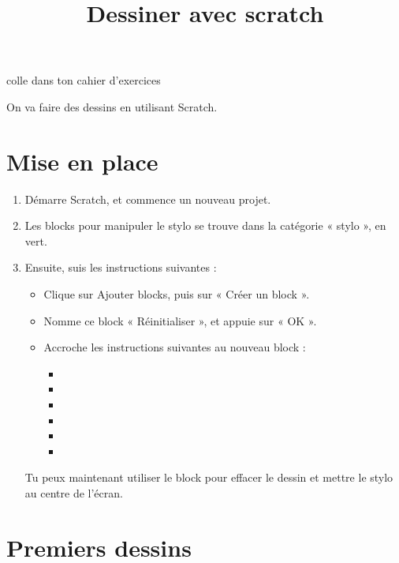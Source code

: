 \documentclass[a4paper,11pt]{article}
\title{Dessiner avec scratch}
\author{}
\date{}
\makeatletter
\renewcommand{\maketitle}{%
{\scriptsize colle dans ton cahier d'exercices}
	\begin{center}
		\LARGE
		\uline{\@title}
		\vspace{1em}
	\end{center}
}
\makeatother
\begin{document}
\maketitle

On va faire des dessins en utilisant Scratch.

\section{Mise en place}

\begin{enumerate}[1)]
	\item Démarre Scratch, et commence un nouveau projet.
	\item Les blocks pour manipuler le stylo se trouve dans la catégorie « stylo », en {\color{Green}vert}.
	\item Ensuite, suis les instructions suivantes :
	      \begin{itemize}
		      \item Clique sur {\color{violet}Ajouter blocks}, puis sur « Créer un block ».
		      \item Nomme ce block « Réinitialiser », et appuie sur « OK ».
		      \item Accroche les instructions suivantes au nouveau block :
		            \begin{itemize}
			            \item[] 
			            \item[] 
			            \item[] 
			            \item[] 
			            \item[] 
			            \item[] 
		            \end{itemize}
	      \end{itemize}
	      Tu peux maintenant utiliser le block  pour effacer le dessin et mettre le stylo au centre de l'écran.
\end{enumerate}

\section{Premiers dessins}
\end{document}
